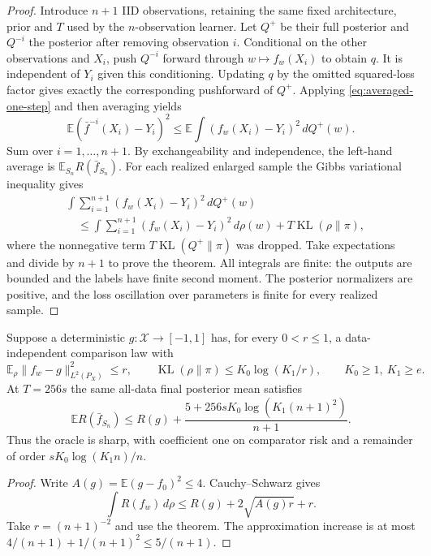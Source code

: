 \begin{proof}
Introduce $n+1$ IID observations, retaining the same fixed architecture,
prior and $T$ used by the $n$-observation learner. Let $Q^+$ be their full
posterior and $Q^{-i}$ the posterior after removing observation $i$.
Conditional on the other observations and $X_i$, push $Q^{-i}$ forward
through $w\mapsto f_w(X_i)$ to obtain $q$. It is independent of $Y_i$
given this conditioning. Updating $q$ by the omitted squared-loss factor
gives exactly the corresponding pushforward of $Q^+$.
Applying \eqref{eq:averaged-one-step} and then averaging yields
\[
 \mathbb E (\bar f^{-i}(X_i)-Y_i)^2
 \le\mathbb E\int(f_w(X_i)-Y_i)^2\,dQ^+(w).
\]
Sum over $i=1,\ldots,n+1$. By exchangeability and independence, the
left-hand average is $\mathbb E_{S_n}R(\bar f_{S_n})$.
For each realized enlarged sample the Gibbs variational inequality gives
\begin{align*}
 &\int\sum_{i=1}^{n+1}(f_w(X_i)-Y_i)^2\,dQ^+(w)\\
 &\quad\le\int\sum_{i=1}^{n+1}(f_w(X_i)-Y_i)^2\,d\rho(w)
             +T\operatorname{KL}(\rho\|\pi),
\end{align*}
where the nonnegative term $T\operatorname{KL}(Q^+\|\pi)$ was dropped.
Take expectations and divide by $n+1$ to prove the theorem.
All integrals are finite: the outputs are bounded and the labels have
finite second moment. The posterior normalizers are positive, and the
loss oscillation over parameters is finite for every realized sample.
\end{proof}

\begin{corollary}
\label{cor:all-data-log-comparison}
Suppose a deterministic $g:\mathcal X\to[-1,1]$ has, for every $0<r\le1$,
a data-independent comparison law with
\[
 \mathbb E_\rho\|f_w-g\|_{L^2(P_X)}^2\le r,
 \qquad \operatorname{KL}(\rho\|\pi)\le K_0\log(K_1/r),
 \qquad K_0\ge1,\ K_1\ge e.
\]
At $T=256s$ the same all-data final posterior mean satisfies
\[
 \mathbb E R(\bar f_{S_n})
 \le R(g)+\frac{5+256sK_0\log(K_1(n+1)^2)}{n+1}.
\]
Thus the oracle is sharp, with coefficient one on comparator risk and
a remainder of order $sK_0\log(K_1n)/n$.
\end{corollary}
\begin{proof}
Write $A(g)=\mathbb E(g-f_0)^2\le4$. Cauchy--Schwarz gives
\[
 \int R(f_w)\,d\rho
 \le R(g)+2\sqrt{A(g)r}+r.
\]
Take $r=(n+1)^{-2}$ and use the theorem. The approximation increase is
at most $4/(n+1)+1/(n+1)^2\le5/(n+1)$.
\end{proof}

